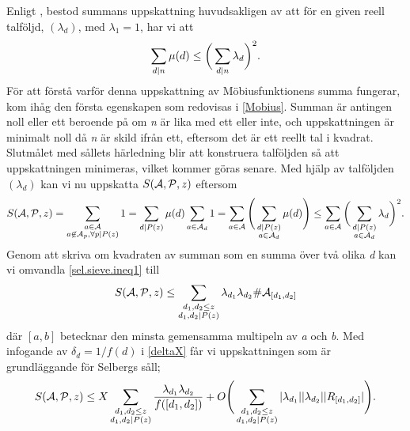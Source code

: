 Enligt \cite{cojocarumurty}, bestod summans uppskattning huvudsakligen av att för en given reell talföljd, \((\lambda_d)\), med \(\lambda_1 = 1\), har vi att 
\begin{equation}
    \sum_{d\divides n}\mu(d) \leq \bigg(\sum_{d\divides n}\lambda_d\bigg)^2.\nonumber
\end{equation}
För att förstå varför denna uppskattning av Möbiusfunktionens summa fungerar, kom ihåg den första egenskapen som redovisas i \ref{Mobius}. 
Summan är antingen noll eller ett beroende på om \textit{n} är lika med ett eller inte, och uppskattningen är minimalt noll då \textit{n} är skild ifrån ett, eftersom det är ett reellt tal i kvadrat.
Slutmålet med sållets härledning blir att konstruera talföljden så att uppskattningen minimeras, vilket kommer göras senare.
Med hjälp av talföljden \((\lambda_d)\) kan vi nu uppskatta \(\S{A}{P}{z}\) eftersom
\begin{equation}
\S{A}{P}{z} = \sum_{\substack{a\in \mathcal{A}\\a\not\in\mathcal{A}_p,\forall p\divides P(z)}} 1 = \sum_{d\divides P(z)} \mu(d) \sum_{a\in\mathcal{A}_d}1 = \sum_{a\in \A} \Bigg(\sum_{\substack{d\divides P(z)\\a\in \A_d}}\mu(d)\Bigg)\leq \sum_{a\in \A}\bigg(\sum_{\substack{d\divides P(z)\\a\in \A_d}}\lambda_d\bigg)^2.\label{sel.sieve.ineq1}
\end{equation}
Genom att skriva om kvadraten av summan som en summa över två olika \textit{d} kan vi omvandla \eqref{sel.sieve.ineq1} till
\begin{equation}
    \S{A}{P}{z} \leq \sum_{\substack{d_1,d_2\leq z\\d_1,d_2\divides P(z)}}\lambda_{d_1}\lambda_{d_2}\#\A_{[d_1, d_2]}\nonumber
\end{equation}
där \([a, b]\) betecknar den minsta gemensamma multipeln av \textit{a} och \textit{b}. 
Med infogande av \(\delta_d = 1/f(d)\) i \eqref{deltaX} får vi uppskattningen som är grundläggande för Selbergs såll;
\begin{equation}
    \S{A}{P}{z} \leq X\sum_{\substack{d_1,d_2\leq z\\d_1,d_2\divides P(z)}}\frac{\lambda_{d_1}\lambda_{d_2}}{f([d_1,d_2])} + O\Bigg(\sum_{\substack{d_1,d_2\leq z\\d_1,d_2\divides P(z)}}|\lambda_{d_1}||\lambda_{d_2}||R_{[d_1, d_2]}|\Bigg)\label{sel.sieve.main}.
\end{equation}

